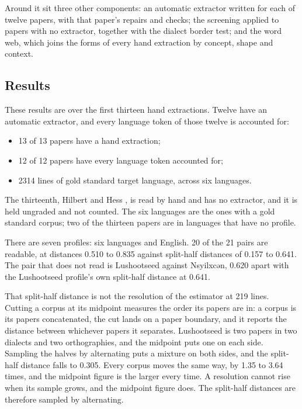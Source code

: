 Around it sit three other components: an automatic extractor written for each of twelve papers, with that paper's repairs and checks; the screening applied to papers with no extractor, together with the dialect border test; and the word web, which joins the forms of every hand extraction by concept, shape and context.

\subsection{Results}

These results are over the first thirteen hand extractions. Twelve have an automatic extractor, and every language token of those twelve is accounted for:

\begin{itemize}
\item 13 of 13 papers have a hand extraction;
\item 12 of 12 papers have every language token accounted for;
\item 2314 lines of gold standard target language, across six languages.
\end{itemize}

The thirteenth, Hilbert and Hess \cite{src:Hilbert-and-Hess-1975}, is read by hand and has no extractor, and it is held ungraded and not counted. The six languages are the ones with a gold standard corpus; two of the thirteen papers are in languages that have no profile.

There are seven profiles: six languages and English. 20 of the 21 pairs are readable, at distances 0.510 to 0.835 against split-half distances of 0.157 to 0.641. The pair that does not read is Lushootseed against Nsyilxcən, 0.620 apart with the Lushootseed profile's own split-half distance at 0.641.

That split-half distance is not the resolution of the estimator at 219 lines. Cutting a corpus at its midpoint measures the order its papers are in: a corpus is its papers concatenated, the cut lands on a paper boundary, and it reports the distance between whichever papers it separates. Lushootseed is two papers in two dialects and two orthographies, and the midpoint puts one on each side. Sampling the halves by alternating puts a mixture on both sides, and the split-half distance falls to 0.305. Every corpus moves the same way, by 1.35 to 3.64 times, and the midpoint figure is the larger every time. A resolution cannot rise when its sample grows, and the midpoint figure does. The split-half distances are therefore sampled by alternating.

